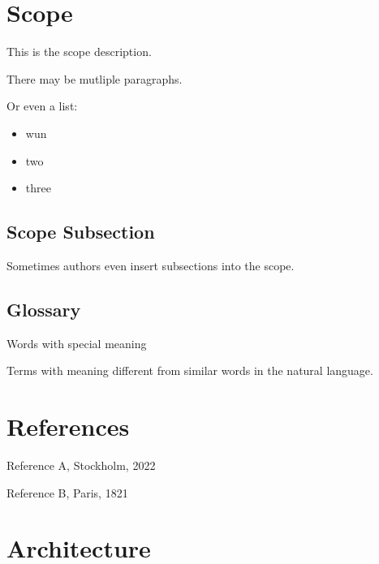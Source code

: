 \hypertarget{scope}{%
\section{Scope}\label{scope}}

This is the scope description.

There may be mutliple paragraphs.

Or even a list:

\begin{itemize}
\tightlist
\item
  wun
\item
  two
\item
  three
\end{itemize}

\hypertarget{scope-subsection}{%
\subsection{Scope Subsection}\label{scope-subsection}}

Sometimes authors even insert subsections into the scope.

\hypertarget{glossary}{%
\subsection{Glossary}\label{glossary}}

\begin{description}
\tightlist
\item[Term]
Words with special meaning
\item[Design\_Term]
Terms with meaning different from similar words in the natural language.
\end{description}

\hypertarget{references}{%
\section{References}\label{references}}

\begin{description}
\tightlist
\item[{[}REF-A{]}]
Reference A, Stockholm, 2022
\item[{[}REF-B{]}]
Reference B, Paris, 1821
\end{description}

\hypertarget{architecture}{%
\section{Architecture}\label{architecture}}

